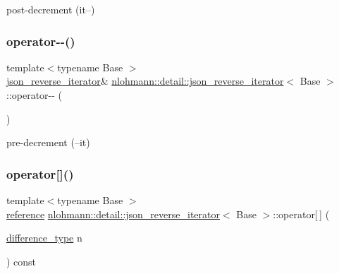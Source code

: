 post-\/decrement (it--) 

\mbox{\label{classnlohmann_1_1detail_1_1json__reverse__iterator_a2488d6a902103610943920ac49d12a04}} 
\subsubsection{\texorpdfstring{operator-\/-\/()}{operator--()}\hspace{0.1cm}{\footnotesize\ttfamily [2/2]}}
{\footnotesize\ttfamily template$<$typename Base $>$ \\
\mbox{\hyperlink{classnlohmann_1_1detail_1_1json__reverse__iterator}{json\+\_\+reverse\+\_\+iterator}}\& \mbox{\hyperlink{classnlohmann_1_1detail_1_1json__reverse__iterator}{nlohmann\+::detail\+::json\+\_\+reverse\+\_\+iterator}}$<$ Base $>$\+::operator-\/-\/ (\begin{DoxyParamCaption}{ }\end{DoxyParamCaption})\hspace{0.3cm}{\ttfamily [inline]}}



pre-\/decrement (--it) 

\mbox{\label{classnlohmann_1_1detail_1_1json__reverse__iterator_a8ed9e445e03c49c46612eb7f7d55bb61}} 
\subsubsection{\texorpdfstring{operator[]()}{operator[]()}}
{\footnotesize\ttfamily template$<$typename Base $>$ \\
\mbox{\hyperlink{classnlohmann_1_1detail_1_1json__reverse__iterator_a42f51a69bac7b2aebb613b2164e457f1}{reference}} \mbox{\hyperlink{classnlohmann_1_1detail_1_1json__reverse__iterator}{nlohmann\+::detail\+::json\+\_\+reverse\+\_\+iterator}}$<$ Base $>$\+::operator\mbox{[}$\,$\mbox{]} (\begin{DoxyParamCaption}\item[{\mbox{\hyperlink{classnlohmann_1_1detail_1_1json__reverse__iterator_a9ab55987c05ec6427ad36082e351cc45}{difference\+\_\+type}}}]{n }\end{DoxyParamCaption}) const\hspace{0.3cm}{\ttfamily [inline]}}



